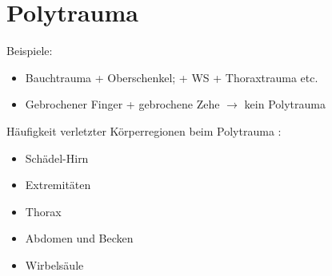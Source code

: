 {
}{}


\clearpage %
\section{Polytrauma}
\label{topic:polytrauma}



Beispiele:
\begin{itemize}
  \item Bauchtrauma + Oberschenkel;  + WS + Thoraxtrauma etc.
  \item Gebrochener Finger + gebrochene Zehe ${\rightarrow}$ kein
  Polytrauma
\end{itemize}

Häufigkeit verletzter Körperregionen beim Polytrauma
\cite{BoehmerTaschRett6,Gorgass7}:
\begin{itemize}
  \item {}\PC* Schädel-Hirn
  \item {}\PC* Extremitäten
  \item {}\PC* Thorax
  \item {}\PC* Abdomen und Becken
  \item {}\PC* Wirbelsäule
\end{itemize}

